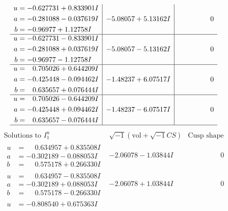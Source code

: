 \documentclass[1p]{elsarticle_modified}
\theoremstyle{definition}
\newcommand{\I}{\sqrt{-1}}
\begin{document}
$$\begin{array}{c|c|c}
\begin{aligned}
u &= -0.627731 + 0.833901 I \\
a &= -0.281088 - 0.037619 I \\
b &= -0.96977 + 1.12758 I\end{aligned}
 & -5.08057 + 5.13162 I & \phantom{-0.000000 } 0 \\ \hline\begin{aligned}
u &= -0.627731 - 0.833901 I \\
a &= -0.281088 + 0.037619 I \\
b &= -0.96977 - 1.12758 I\end{aligned}
 & -5.08057 - 5.13162 I & \phantom{-0.000000 } 0 \\ \hline\begin{aligned}
u &= \phantom{-}0.705026 + 0.644209 I \\
a &= -0.425448 - 0.094462 I \\
b &= \phantom{-}0.635657 + 0.076444 I\end{aligned}
 & -1.48237 + 6.07517 I & \phantom{-0.000000 } 0 \\ \hline\begin{aligned}
u &= \phantom{-}0.705026 - 0.644209 I \\
a &= -0.425448 + 0.094462 I \\
b &= \phantom{-}0.635657 - 0.076444 I\end{aligned}
 & -1.48237 - 6.07517 I & \phantom{-0.000000 } 0\\
 \hline 
 \end{array}$$\newpage$$\begin{array}{c|c|c}  
\text{Solutions to }I^u_{1}& \I (\text{vol} + \sqrt{-1}CS) & \text{Cusp shape}\\
 \hline 
\begin{aligned}
u &= \phantom{-}0.634957 + 0.835508 I \\
a &= -0.302189 - 0.088053 I \\
b &= \phantom{-}0.575178 + 0.266330 I\end{aligned}
 & -2.06078 - 1.03844 I & \phantom{-0.000000 } 0 \\ \hline\begin{aligned}
u &= \phantom{-}0.634957 - 0.835508 I \\
a &= -0.302189 + 0.088053 I \\
b &= \phantom{-}0.575178 - 0.266330 I\end{aligned}
 & -2.06078 + 1.03844 I & \phantom{-0.000000 } 0 \\ \hline\begin{aligned}
u &= -0.808540 + 0.675363 I \\

\end{aligned}
\end{array}$$
\end{document}
